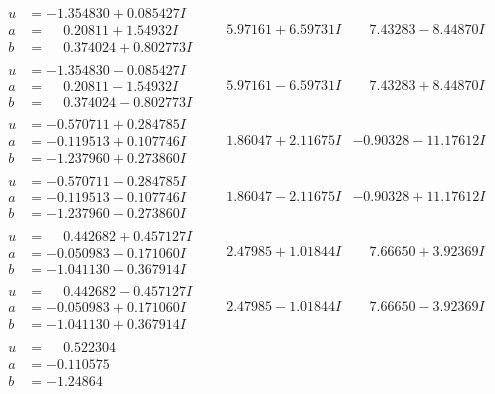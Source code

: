 \documentclass[1p]{elsarticle_modified}
\theoremstyle{definition}
\begin{document}
$$\begin{array}{c|c|c}
\begin{aligned}
u &= -1.354830 + 0.085427 I \\
a &= \phantom{-}0.20811 + 1.54932 I \\
b &= \phantom{-}0.374024 + 0.802773 I\end{aligned}
 & \phantom{-}5.97161 + 6.59731 I & \phantom{-}7.43283 - 8.44870 I \\ \hline\begin{aligned}
u &= -1.354830 - 0.085427 I \\
a &= \phantom{-}0.20811 - 1.54932 I \\
b &= \phantom{-}0.374024 - 0.802773 I\end{aligned}
 & \phantom{-}5.97161 - 6.59731 I & \phantom{-}7.43283 + 8.44870 I \\ \hline\begin{aligned}
u &= -0.570711 + 0.284785 I \\
a &= -0.119513 + 0.107746 I \\
b &= -1.237960 + 0.273860 I\end{aligned}
 & \phantom{-}1.86047 + 2.11675 I & -0.90328 - 11.17612 I \\ \hline\begin{aligned}
u &= -0.570711 - 0.284785 I \\
a &= -0.119513 - 0.107746 I \\
b &= -1.237960 - 0.273860 I\end{aligned}
 & \phantom{-}1.86047 - 2.11675 I & -0.90328 + 11.17612 I \\ \hline\begin{aligned}
u &= \phantom{-}0.442682 + 0.457127 I \\
a &= -0.050983 - 0.171060 I \\
b &= -1.041130 - 0.367914 I\end{aligned}
 & \phantom{-}2.47985 + 1.01844 I & \phantom{-}7.66650 + 3.92369 I \\ \hline\begin{aligned}
u &= \phantom{-}0.442682 - 0.457127 I \\
a &= -0.050983 + 0.171060 I \\
b &= -1.041130 + 0.367914 I\end{aligned}
 & \phantom{-}2.47985 - 1.01844 I & \phantom{-}7.66650 - 3.92369 I \\ \hline\begin{aligned}
u &= \phantom{-}0.522304\phantom{ +0.000000I} \\
a &= -0.110575\phantom{ +0.000000I} \\
b &= -1.24864\phantom{ +0.000000I}\end{aligned}

\end{array}$$
\end{document}
